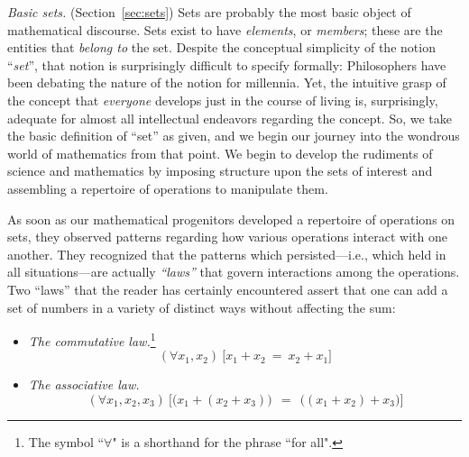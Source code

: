    
{\it Basic sets.}  (Section~\ref{sec:sets})  Sets are probably the most basic object of mathematical discourse.  Sets exist to have {\it elements},  or {\it members}; these are the entities that {\em belong to} the set.  Despite the conceptual simplicity of the notion ``{\it set}'', that notion is surprisingly difficult to specify formally: Philosophers have been debating the
nature of the notion for millennia.  Yet, the intuitive grasp of the concept that {\em everyone} develops just in the course of living is, surprisingly, adequate for almost all intellectual endeavors regarding the concept.  So, we take the basic definition of ``set'' as given, and we begin our journey into the wondrous world of mathematics from that point.  We begin to develop the rudiments of science and mathematics by imposing structure upon the sets of interest and assembling a repertoire of operations to manipulate them.

\smallskip

 
  

As soon as our mathematical progenitors developed a repertoire of operations on sets, they observed patterns regarding how various operations interact with one another.  They recognized that the patterns which persisted---i.e., which held in all situations---are actually {\em ``laws''} that govern interactions among the operations.  Two ``laws'' that the reader has certainly encountered assert that one can add a set of numbers in a variety of distinct ways without affecting the sum:
\begin{itemize}
\item
{\it The commutative law.}\footnote{The symbol ``$\forall$" is a shorthand for the phrase ``for all".}
\[ (\forall x_1, x_2) \ \big[ x_1 + x_2 \ = \ x_2 + x_1 \big] \]

\medskip\item
{\it The associative law.}
\[ (\forall x_1, x_2, x_3) \ \big[ \big(x_1 + (x_2 + x_3)\big) \ \
= \ \ \big((x_1 + x_2) + x_3\big) \big]
\]
\end{itemize}

\bigskip

